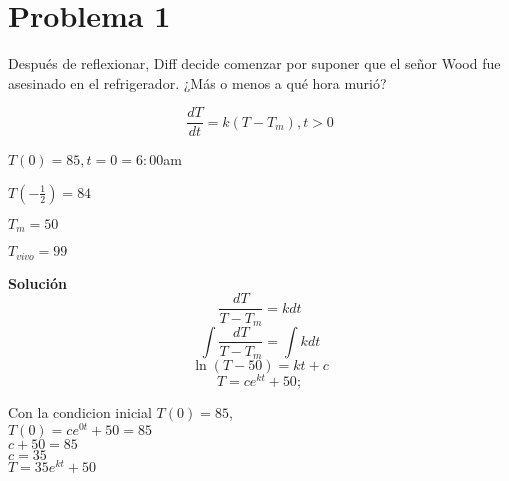 \section*{Problema 1}
Después de reflexionar, Diff decide comenzar por suponer que el señor Wood fue asesinado en el refrigerador. 
¿Más o menos a qué hora murió?

\begin{equation}
    \frac{dT}{dt} = k(T - T_m), t > 0
\end{equation}
\begin{center}
$T(0) = 85, t = 0 = 6:00$am\\
\vspace{8pt}

$T(-\frac{1}{2}) = 84$\\
\vspace{8pt}

$T_m = 50$\\
\vspace{8pt}

$T_{vivo} = 99$\\ 
\vspace{12pt}


\textbf{Solución}\\ 
\begin{equation*}
\frac{dT}{T - T_m} = kdt
\end{equation*}
\vspace{2pt}
\begin{equation*}
\int{\frac{dT}{T - T_m}} = \int{kdt}
\end{equation*}
\vspace{2pt}
\begin{equation*}
\ln{(T - 50)} = kt + c
\end{equation*}
\vspace{2pt}
\begin{equation*}
T = ce^{kt} + 50;
\end{equation*}
\vspace{2pt}

Con la condicion inicial $T(0) = 85$,\\
\vspace{8pt}
$T(0) = ce^{0t} + 50 = 85$\\
\vspace{8pt}
$c + 50 = 85$\\
\vspace{8pt}
$c = 35$\\
\vspace{8pt}
$T = 35e^{kt} + 50$\\
\vspace{12pt}


\end{center}
